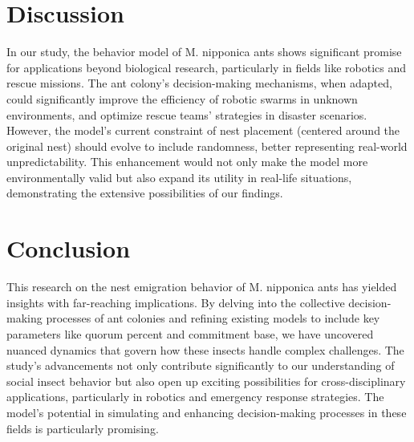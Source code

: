 \documentclass[9pt]{pnas-new}
\begin{document}
\section*{Discussion}
In our study, the behavior model of M. nipponica ants shows significant promise for applications beyond biological research, particularly in fields like robotics and rescue missions. The ant colony's decision-making mechanisms, when adapted, could significantly improve the efficiency of robotic swarms in unknown environments, and optimize rescue teams' strategies in disaster scenarios. However, the model's current constraint of nest placement (centered around the original nest) should evolve to include randomness, better representing real-world unpredictability. This enhancement would not only make the model more environmentally valid but also expand its utility in real-life situations, demonstrating the extensive possibilities of our findings.



\section*{Conclusion}
This research on the nest emigration behavior of M. nipponica ants has yielded insights with far-reaching implications. By delving into the collective decision-making processes of ant colonies and refining existing models to include key parameters like quorum percent and commitment base, we have uncovered nuanced dynamics that govern how these insects handle complex challenges. The study's advancements not only contribute significantly to our understanding of social insect behavior but also open up exciting possibilities for cross-disciplinary applications, particularly in robotics and emergency response strategies. The model's potential in simulating and enhancing decision-making processes in these fields is particularly promising.


 
\showacknow %


\section*{\bibname}


\end{document}

